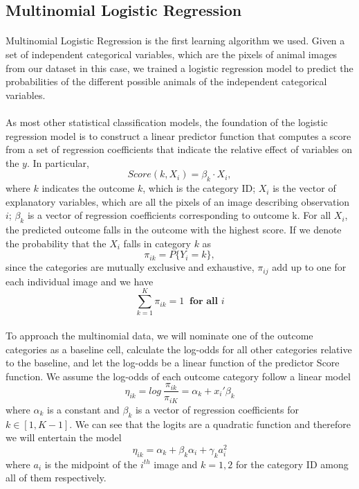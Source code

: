 \documentclass{article}
\begin{document}
\subsection{Multinomial Logistic Regression}
\paragraph{}
Multinomial Logistic Regression is the first learning algorithm we used. Given a set of independent categorical variables, which are the pixels of animal images from our dataset in this case, we trained a logistic regression model to predict the probabilities of the different possible animals of the independent  categorical variables.
\paragraph{}
As most other statistical classification models, the foundation of the logistic regression model is to construct a linear predictor function that computes a score from a set of regression coefficients  that indicate the relative effect of variables on the $y$. In particular, \[
Score(k, X_i) = \beta_k \cdot X_i,
\]
where $k$ indicates the outcome  $k$, which is the category ID; $X_i$ is the vector of explanatory variables, which are all the pixels of an image describing observation $i$; $\beta_k$ is a vector of  regression coefficients corresponding to outcome k. For all $X_i$, the predicted outcome falls in the outcome with the highest score. If we denote the probability that the $X_i$ falls in category $k$ as \[ \pi_{ik} = P\{Y_i = k\},
\]
since the categories are mutually exclusive and exhaustive, $\pi_{ij}$ add up to one for each individual  image and we have \[ 
\sum_{k=1}^K \pi_{ik} = 1 \ \textbf{ for all }  i \]
\paragraph{}
To approach the multinomial data, we will nominate one of the outcome categories as a baseline cell, calculate the log-odds for all other categories relative to the baseline, and let the log-odds be a linear function of the predictor Score function. We assume the log-odds of each outcome category follow a linear model \[
\eta_{ik} = log \ \frac{ \pi_{ik} }{ \pi_{iK} } = \alpha_k + x_i'\beta_k
\]
where $\alpha_k$ is a constant and $\beta_k$ is a vector of regression coefficients for $k \in [1, K-1]$.
We can see that the logits are a quadratic function and therefore we will entertain the model \[
\eta_{ik} = \alpha_k + \beta_k \alpha_i + \gamma_k a_i^2 \]
where $a_i$ is the midpoint of the $i^{th}$ image and $k = 1, 2$ for the category ID among all of them respectively.
\end{document}
